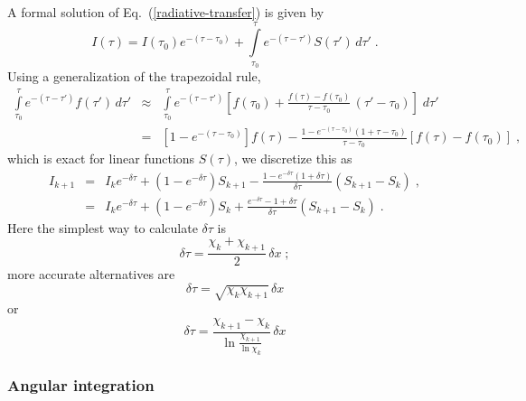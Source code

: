 \documentclass[\mydriver,12pt,twoside,notitlepage,a4paper]{article}
\begin{document}
A formal solution of Eq.~(\ref{radiative-transfer}) is given by
\begin{equation}
  I(\tau) = I(\tau_0) e^{-(\tau-\tau_0)}
            + \int\limits_{\tau_0}^\tau e^{-(\tau-\tau')} S(\tau')\,d\tau' \; .
\end{equation}
Using a generalization of the trapezoidal rule,
\begin{eqnarray}
  \int\limits_{\tau_0}^\tau e^{-(\tau-\tau')} f(\tau')\,d\tau'
  &\approx& \int\limits_{\tau_0}^\tau e^{-(\tau-\tau')}
              \left[ f(\tau_0) + \frac{f(\tau){-}f(\tau_0)}{\tau-\tau_0}\,
              (\tau'-\tau_0)\right] \; d\tau'\\
  &=&       \left[1{-}e^{-(\tau-\tau_0)}\right] f(\tau)
          - \frac{1 - e^{-(\tau-\tau_0)}(1+\tau{-}\tau_0)}{\tau-\tau_0}
            [f(\tau)-f(\tau_0)]
  \; ,
\end{eqnarray}
which is exact for linear functions $S(\tau)$, we discretize this as
\begin{eqnarray}
  I_{k+1} &=& I_k e^{-\delta\tau}
              + (1{-}e^{-\delta\tau}) S_{k+1}
              - \frac{1 - e^{-\delta\tau}(1+\delta\tau)}{\delta\tau}
                (S_{k+1}-S_k) \; , \\
          &=& I_k e^{-\delta\tau}
              + (1{-}e^{-\delta\tau}) S_{k}
              + \frac{e^{-\delta\tau}-1+\delta\tau}{\delta\tau}
                (S_{k+1}-S_k) \; .
\end{eqnarray}
Here the simplest way to calculate $\delta\tau$ is
\begin{equation}
  \delta\tau = \frac{\chi_k{+}\chi_{k+1}}{2} \, \delta x \; ;
\end{equation}
more accurate alternatives are
\begin{equation}
  \delta\tau = \sqrt{\chi_k\chi_{k+1}} \, \delta x
\end{equation}
or
\begin{equation}
  \delta\tau
  = \frac{\chi_{k+1}-\chi_k}{\ln\frac{\chi_{k+1}}{\ln\chi_k}} \, \delta x
\end{equation}


\subsubsection{Angular integration}
\end{document}
